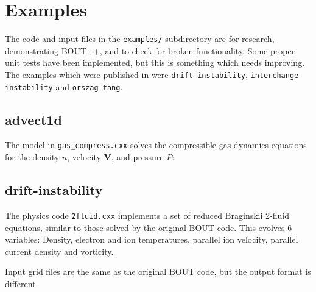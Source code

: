 \documentclass[12pt]{article}
\begin{document}
\section{Examples}
\label{sec:examples}

The code and input files in the \texttt{examples/} subdirectory are for research, demonstrating BOUT++,
and to check for broken functionality. Some proper unit tests have been implemented, but this
is something which needs improving. The examples which were published in \cite{Dudson2009,dudson-2008-arxiv}
were \texttt{drift-instability}, \texttt{interchange-instability} and \texttt{orszag-tang}.


\subsection{advect1d}

The model in \texttt{gas\_compress.cxx} solves the compressible gas dynamics equations for
the density $n$, velocity $\mathbf{V}$, and pressure $P$:

\subsection{drift-instability}

The physics code \texttt{2fluid.cxx} implements a set of reduced Braginskii 2-fluid equations,
similar to those solved by the original BOUT code.
This evolves 6 variables: Density, electron and ion temperatures, parallel ion velocity,
parallel current density and vorticity.

Input grid files are the same as the original BOUT code, but the output format is different.
\end{document}
